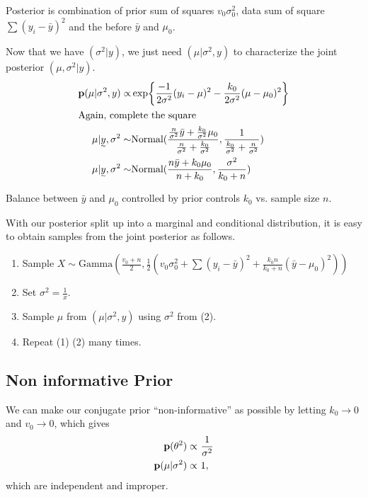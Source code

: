 Posterior is combination of prior sum of squares $v_0\sigma_0^2$, data sum of square $\sum(y_i - \bar{y})^2$ and the before $\bar{y}$ and $\mu_0$.

Now that we have $(\sigma^2|y)$, we just need $(\mu|\sigma^2, y)$ to characterize the joint posterior $(\mu, \sigma^2|y)$.
\begin{align*}
    \p(\mu| \sigma^2, y) 
    \propto &
    \exp{\frac{-1}{2\sigma^2} (y_i - \mu)^2 - \frac{k_0}{2\sigma^2}(\mu - \mu_0)^2}  \\
    \intertext{Again, complete the square}
    \mu| \vec{y}, \sigma^2
    \sim &
    \text{Normal}(
    \frac{
    \frac{n}{\sigma^2} \bar{y} + \frac{k_0}{\sigma^2}\mu_0
    }{\frac{n}{\sigma^2} + \frac{k_0}{\sigma^2}}
    ,
    \frac{1}{\frac{k_0}{\sigma^2} + \frac{n}{\sigma^2}}
    )\\
    \mu| \vec{y}, \sigma^2
    \sim &
    \text{Normal}(
    \frac{
    n \bar{y} + k_0\mu_0
    }{n + k_0}
    ,
    \frac{\sigma^2}{k_0 + n}
    )
\end{align*}

Balance between $\bar{y}$ and $\mu_0$ controlled by prior controls $k_0$ vs. sample size $n$.

With our posterior split up into a marginal and conditional distribution, it is easy to obtain samples from the joint posterior as follows.

\begin{enumerate}[(1)]
    \item Sample 
    $X \sim \text{Gamma}(\frac{v_0 + n}{2}, 
            \frac{1}{2} (v_0\sigma_0^2 + \sum(y_i - \bar{y})^2 + \frac{k_0 n}{k_0 + n}(\bar{y}-\mu_0)^2))$
    \item Set $\sigma^2 = \frac{1}{x}$.
    \item Sample $\mu$ from $(\mu|\sigma^2, y)$ using $\sigma^2$ from (2).
    \item Repeat (1) (2) many times.
\end{enumerate}

\subsection{Non informative Prior}
We can make our conjugate prior ``non-informative'' as possible by letting $k_0 \rightarrow 0$ and $v_0 \rightarrow 0$, which gives 
\begin{align*}
    {\mathbf p}(\theta^2) \propto& ~\frac{1}{\sigma^2}\\
    {\mathbf p}(\mu| \sigma^2) \propto& ~1,
\end{align*}
which are independent and improper.

